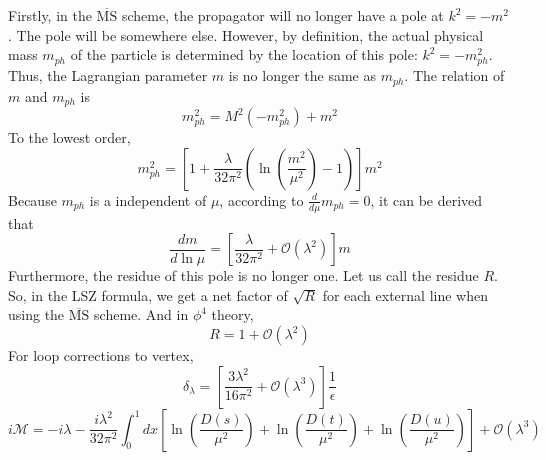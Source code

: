 Firstly, in the $\mathrm{\overline{MS}}$ scheme, the propagator will no longer have a pole at $k^2=-m^2$. The pole will be somewhere else. However, by definition, the actual physical mass $m_{ph}$ of the particle is determined by the location of this pole: $k^2 = -m_{ph}^2$. Thus, the Lagrangian parameter $m$ is no longer the same as $m_{ph}$. The relation of $m$ and $m_{ph}$ is 
\[m_{ph}^2 = M^2(-m_{ph}^2) + m^2\]
To the lowest order, 
\[m_{ph}^2 = \left[1+\frac{\lambda}{32\pi^2}( \ln(\frac{m^2}{\mu^2})-1)\right] m^2\]
Because $m_{ph}$ is a independent of $\mu$, according to $\frac{d}{d\mu} m_{ph} = 0$, it can be derived that
\[\frac{dm}{d\ln \mu} = \left[\frac{\lambda}{32\pi^2}+\mathcal{O}(\lambda^2)\right] m\]
Furthermore, the residue of this pole is no longer one. Let us call the residue $R$. So, in the LSZ formula, we get a net factor of $\sqrt{R}$ for each external line when using the $\mathrm{\overline{MS}}$ scheme. And in $\phi^4$ theory,
\[R = 1 + \mathcal{O}(\lambda^2)\]
For loop corrections to vertex,
\[\delta_{\lambda} = \left[\frac{3\lambda^2}{16\pi^2} + \mathcal{O}(\lambda^3)\right]\frac{1}{\epsilon}\]
\[i\mathcal{M} = -i\lambda -\frac{i\lambda^2}{32\pi^2} \int_0^1 dx \left[\ln(\frac{D(s)}{\mu^2}) +\ln(\frac{D(t)}{\mu^2})+\ln(\frac{D(u)}{\mu^2})\right] + \mathcal{O}(\lambda^3)\]

